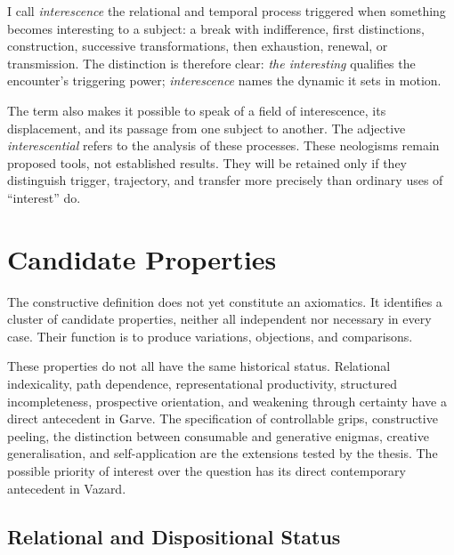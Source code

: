 \documentclass[11pt,a4paper]{article}
\begin{document}
I call \emph{interescence} the relational and temporal process triggered when
something becomes interesting to a subject: a break with indifference, first
distinctions, construction, successive transformations, then exhaustion,
renewal, or transmission. The distinction is therefore clear: \emph{the
interesting} qualifies the encounter's triggering power; \emph{interescence}
names the dynamic it sets in motion.

The term also makes it possible to speak of a field of interescence, its
displacement, and its passage from one subject to another. The adjective
\emph{interescential} refers to the analysis of these processes. These
neologisms remain proposed tools, not established results. They will be retained
only if they distinguish trigger, trajectory, and transfer more precisely than
ordinary uses of ``interest'' do.

\section{Candidate Properties}

The constructive definition does not yet constitute an axiomatics. It identifies
a cluster of candidate properties, neither all independent nor necessary in
every case. Their function is to produce variations, objections, and
comparisons.

These properties do not all have the same historical status. Relational
indexicality, path dependence, representational productivity, structured
incompleteness, prospective orientation, and weakening through certainty have a
direct antecedent in Garve. The specification of controllable grips,
constructive peeling, the distinction between consumable and generative
enigmas, creative generalisation, and self-application are the extensions tested
by the thesis. The possible priority of interest over the question has its
direct contemporary antecedent in Vazard.

\subsection{Relational and Dispositional Status}
\end{document}
